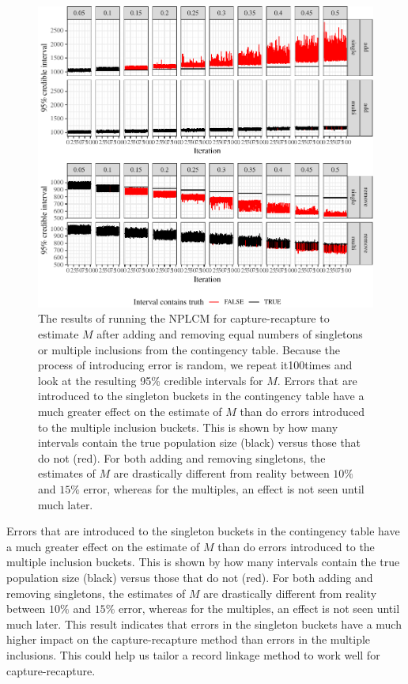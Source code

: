 \documentclass[]{article}
\begin{document}
\begin{figure}
\centering
\includegraphics{singleton_errors_files/figure-latex/fixed-error-plots-1.pdf}
\caption{\label{fig:fixed-error-plots}The results of running the NPLCM
for capture-recapture to estimate \(M\) after adding and removing equal
numbers of singletons or multiple inclusions from the contingency table.
Because the process of introducing error is random, we repeat it100times
and look at the resulting 95\% credible intervals for \(M\). Errors that
are introduced to the singleton buckets in the contingency table have a
much greater effect on the estimate of \(M\) than do errors introduced
to the multiple inclusion buckets. This is shown by how many intervals
contain the true population size (black) versus those that do not (red).
For both adding and removing singletons, the estimates of \(M\) are
drastically different from reality between \(10\%\) and \(15\%\) error,
whereas for the multiples, an effect is not seen until much later.}
\end{figure}

Errors that are introduced to the singleton buckets in the contingency
table have a much greater effect on the estimate of \(M\) than do errors
introduced to the multiple inclusion buckets. This is shown by how many
intervals contain the true population size (black) versus those that do
not (red). For both adding and removing singletons, the estimates of
\(M\) are drastically different from reality between \(10\%\) and
\(15\%\) error, whereas for the multiples, an effect is not seen until
much later. This result indicates that errors in the singleton buckets
have a much higher impact on the capture-recapture method than errors in
the multiple inclusions. This could help us tailor a record linkage
method to work well for capture-recapture.
\end{document}
